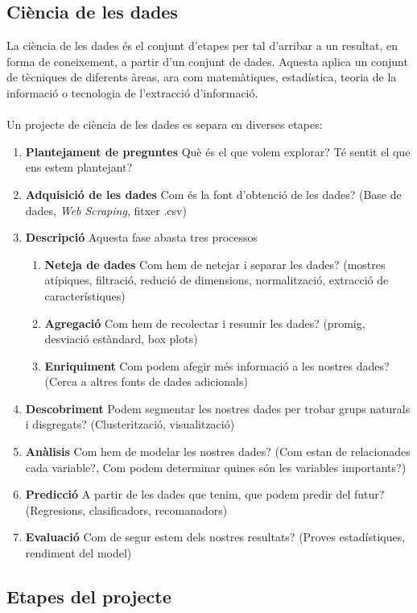 \documentclass[12pt,a4paper,catalan]{article}
\begin{document}
\subsection{Ciència de les dades}
La ciència de les dades és el conjunt d'etapes per tal d'arribar a un resultat, en forma de coneixement, a partir d'un conjunt de dades. Aquesta aplica un conjunt de tècniques de diferents àreas, ara com matemàtiques, estadística, teoria de la informació o tecnologia de l'extracció d'informació.
\\
\\
Un projecte de ciència de les dades es separa en diverses etapes:
\begin{enumerate}
	\item \textbf{Plantejament de preguntes} Què és el que volem explorar? Té sentit el que ens estem plantejant?
	\item \textbf{Adquisició de les dades} Com és la font d'obtenció de les dades? (Base de dades, \textit{Web Scraping}, fitxer .csv)
	\item \textbf{Descripció} Aquesta fase abasta tres processos
	\begin{enumerate}
		\item \textbf{Neteja de dades} Com hem de netejar i separar les dades? (mostres atípiques, filtració, redució de dimensions, normalització, extracció de característiques)
		\item \textbf{Agregació} Com hem de recolectar i resumir les dades? (promig, desviació estàndard, box plots)
		\item \textbf{Enriquiment} Com podem afegir més informació a les nostres dades? (Cerca a altres fonts de dades adicionals)
	\end{enumerate}
	\item \textbf{Descobriment} Podem segmentar les nostres dades per trobar grups naturals i disgregats? (Clusterització, visualització)
	\item \textbf{Anàlisis} Com hem de modelar les nostres dades? (Com estan de relacionades cada variable?, Com podem determinar quines són les variables importants?)
	\item \textbf{Predicció} A partir de les dades que tenim, que podem predir del futur? (Regresions, clasificadors, recomanadors)
	\item \textbf{Evaluació} Com de segur estem dels nostres resultats? (Proves estadístiques, rendiment del model)
\end{enumerate}

\subsection{Etapes del projecte}
\end{document}
